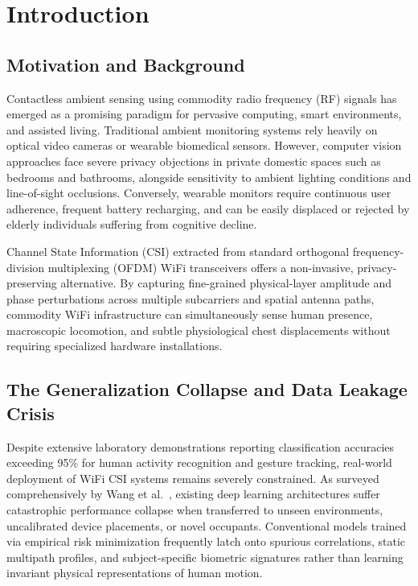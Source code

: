 \chapter{Introduction}

\section{Motivation and Background}
Contactless ambient sensing using commodity radio frequency (RF) signals has emerged as a promising paradigm for pervasive computing, smart environments, and assisted living. Traditional ambient monitoring systems rely heavily on optical video cameras or wearable biomedical sensors. However, computer vision approaches face severe privacy objections in private domestic spaces such as bedrooms and bathrooms, alongside sensitivity to ambient lighting conditions and line-of-sight occlusions. Conversely, wearable monitors require continuous user adherence, frequent battery recharging, and can be easily displaced or rejected by elderly individuals suffering from cognitive decline.

Channel State Information (CSI) extracted from standard orthogonal frequency-division multiplexing (OFDM) WiFi transceivers offers a non-invasive, privacy-preserving alternative. By capturing fine-grained physical-layer amplitude and phase perturbations across multiple subcarriers and spatial antenna paths, commodity WiFi infrastructure can simultaneously sense human presence, macroscopic locomotion, and subtle physiological chest displacements without requiring specialized hardware installations.

\section{The Generalization Collapse and Data Leakage Crisis}
Despite extensive laboratory demonstrations reporting classification accuracies exceeding 95\% for human activity recognition and gesture tracking, real-world deployment of WiFi CSI systems remains severely constrained. As surveyed comprehensively by Wang et al.~\cite{author2025a}, existing deep learning architectures suffer catastrophic performance collapse when transferred to unseen environments, uncalibrated device placements, or novel occupants. Conventional models trained via empirical risk minimization frequently latch onto spurious correlations, static multipath profiles, and subject-specific biometric signatures rather than learning invariant physical representations of human motion.

